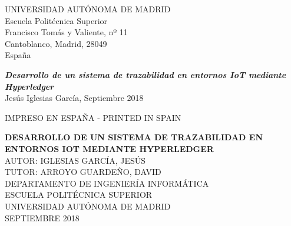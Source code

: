 \documentclass[12pt,a4paper, twoside]{report}
\newcommand{\university}{UNIVERSIDAD AUTÓNOMA DE MADRID}
\newcommand{\faculty}{ESCUELA POLITÉCNICA SUPERIOR}
\newcommand{\dpto}{DEPARTAMENTO DE INGENIERÍA INFORMÁTICA}
\newcommand{\titleTFM}{DESARROLLO DE UN SISTEMA DE TRAZABILIDAD EN ENTORNOS IOT MEDIANTE HYPERLEDGER}
\newcommand{\jesus}{IGLESIAS GARCÍA, JESÚS}
\newcommand{\david}{ARROYO GUARDEÑO, DAVID}
\newcommand{\blankpage}{
				\newpage
				\thispagestyle{empty}
				\mbox{}
				\newpage
				}
\begin{document}
	\begin{flushleft}
		\university \\
		Escuela Politécnica Superior \\
		Francisco Tomás y Valiente, nº 11 \\
		Cantoblanco, Madrid, 28049 \\
		España
		
		\vspace{5mm}	
		
		\textbf{\textit{Desarrollo de un sistema de trazabilidad en entornos IoT mediante Hyperledger}} \\
		Jesús Iglesias García, Septiembre 2018
	
		\vspace{5mm}
	
		IMPRESO EN ESPAÑA - PRINTED IN SPAIN
	\end{flushleft}

	\begin{titlepage}
		\begin{center}
			\vspace*{1.5in}	
			
			\large{\textbf{\titleTFM}} \\
			\vspace*{0.8in}
			\normalsize{AUTOR:} \normalsize{\jesus}  \\
			\vspace*{0.05in}
			\normalsize{TUTOR:} \normalsize{\david} \\
			\vspace*{0.8in}
			\small{\textsc{\dpto}}\\
			\vspace*{0.02in}
			\small{\textsc{\faculty}}\\
			\vspace*{0.02in}
			\small{\textsc{\university}}\\	
			\vspace*{0.02in}
			\small{SEPTIEMBRE 2018} \\
		\end{center}
	\end{titlepage}
		
	\blankpage
	
\end{document}
